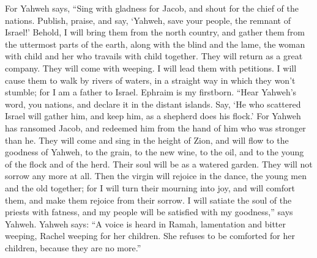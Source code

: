  For Yahweh says, ``Sing with gladness for Jacob, and shout
for the chief of the nations. Publish, praise, and say, `Yahweh, save
your people, the remnant of Israel!'  Behold, I will bring
them from the north country, and gather them from the uttermost parts of
the earth, along with the blind and the lame, the woman with child and
her who travails with child together. They will return as a great
company.  They will come with weeping. I will lead them with
petitions. I will cause them to walk by rivers of waters, in a straight
way in which they won't stumble; for I am a father to Israel. Ephraim is
my firstborn.  ``Hear Yahweh's word, you nations, and
declare it in the distant islands. Say, `He who scattered Israel will
gather him, and keep him, as a shepherd does his flock.' 
For Yahweh has ransomed Jacob, and redeemed him from the hand of him who
was stronger than he.  They will come and sing in the
height of Zion, and will flow to the goodness of Yahweh, to the grain,
to the new wine, to the oil, and to the young of the flock and of the
herd. Their soul will be as a watered garden. They will not sorrow any
more at all.  Then the virgin will rejoice in the dance,
the young men and the old together; for I will turn their mourning into
joy, and will comfort them, and make them rejoice from their sorrow.
 I will satiate the soul of the priests with fatness, and
my people will be satisfied with my goodness,'' says Yahweh.
 Yahweh says: ``A voice is heard in Ramah, lamentation and
bitter weeping, Rachel weeping for her children. She refuses to be
comforted for her children, because they are no more.''

